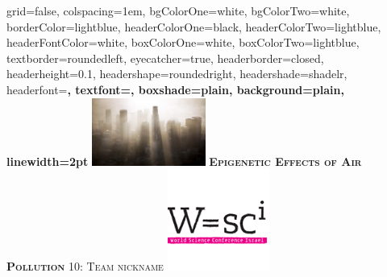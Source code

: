 \documentclass[landscape,final,a0paper,fontscale=0.285]{baposter}
\begin{document}
\begin{poster}%
  {
  grid=false,
  colspacing=1em,
  bgColorOne=white,
  bgColorTwo=white,
  borderColor=lightblue,
  headerColorOne=black,
  headerColorTwo=lightblue,
  headerFontColor=white,
  boxColorOne=white,
  boxColorTwo=lightblue,
  textborder=roundedleft,
  eyecatcher=true,
  headerborder=closed,
  headerheight=0.1\textheight,
  headershape=roundedright,
  headershade=shadelr,
  headerfont=\Large\bf\textsc, %
  textfont={\setlength{\parindent}{1.5em}},
  boxshade=plain,
  background=plain,
  linewidth=2pt
  }
  {\includegraphics[height=6em]{logo_left}} 
  {\bf\textsc{Epigenetic Effects of Air Pollution}\vspace{0.5em}}
  {\textsc{10: Team nickname}}
  {%
    \includegraphics[height=9.0em]{logo_wsci}
  }

    \newcommand{\colouredcircle}{%
      \tikz{\useasboundingbox (-0.2em,-0.32em) rectangle(0.2em,0.32em); \draw[draw=black,fill=lightblue,line width=0.03em] (0,0) circle(0.18em);}}


\end{poster}
\end{document}
